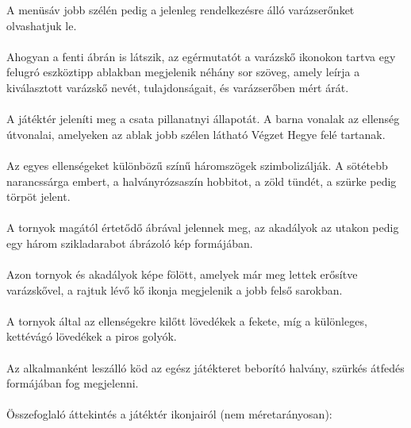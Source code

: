 A menüsáv jobb szélén pedig a jelenleg rendelkezésre álló varázserőnket olvashatjuk le.\\
\\
Ahogyan a fenti ábrán is látszik, az egérmutatót a varázskő ikonokon tartva egy felugró eszköztipp ablakban megjelenik néhány sor szöveg, amely leírja a kiválasztott varázskő nevét, tulajdonságait, és varázserőben mért árát.\\
\\
A játéktér jeleníti meg a csata pillanatnyi állapotát. A barna vonalak az ellenség útvonalai, amelyeken az ablak jobb szélen látható Végzet Hegye felé tartanak.\\
\\
Az egyes ellenségeket különbözű színű háromszögek szimbolizálják. A sötétebb narancssárga embert, a halványrózsaszín hobbitot, a zöld tündét, a szürke pedig törpöt jelent.\\
\\
A tornyok magától értetődő ábrával jelennek meg, az akadályok az utakon pedig egy három szikladarabot ábrázoló kép formájában.\\
\\
Azon tornyok és akadályok képe fölött, amelyek már meg lettek erősítve varázskővel, a rajtuk lévő kő ikonja megjelenik a jobb felső sarokban.\\
\\
A tornyok által az ellenségekre kilőtt lövedékek a fekete, míg a különleges, kettévágó lövedékek a piros golyók.\\
\\
Az alkalmanként leszálló köd az egész játékteret beborító halvány, szürkés átfedés formájában fog megjelenni.\\
\\
Összefoglaló áttekintés a játéktér ikonjairól (nem méretarányosan):

